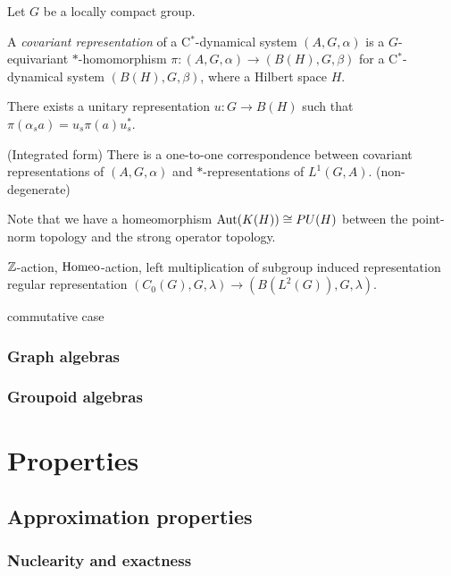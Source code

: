 \documentclass{../../large}
\begin{document}
\begin{prb}
Let $G$ be a locally compact group.

A \emph{covariant representation} of a C$^*$-dynamical system $(A,G,\alpha)$ is a $G$-equivariant $*$-homomorphism $\pi:(A,G,\alpha)\to(B(H),G,\beta)$ for a C$^*$-dynamical system $(B(H),G,\beta)$, where a Hilbert space $H$.
\begin{parts}
\item
There exists a unitary representation $u:G\to B(H)$ such that $\pi(\alpha_sa)=u_s\pi(a)u_s^*$.
\item (Integrated form)
There is a one-to-one correspondence between covariant representations of $(A,G,\alpha)$ and $*$-representations of $L^1(G,A)$. (non-degenerate)
\end{parts}
\end{prb}

Note that we have a homeomorphism $\operatorname{Aut}(K(H))\cong PU(H)$ between the point-norm topology and the strong operator topology.

$\mathbb{Z}$-action, $\operatorname{Homeo}$-action, left multiplication of subgroup
induced representation
regular representation $(C_0(G),G,\lambda)\to(B(L^2(G)),G,\lambda)$.


commutative case




\section{Graph algebras}






\section{Groupoid algebras}









\part{Properties}
\chapter{Approximation properties}
\section{Nuclearity and exactness}
\end{document}
